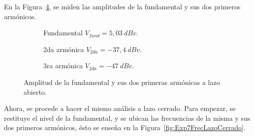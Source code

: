       En la Figura~\ref{fig:Exp7AmplFundYArmonicasLA}, se miden las amplitudes de la fundamental y sus 
      dos primeros armónicos.

    \begin{figure}[H]
        \centering
        \begin{subfigure}[H]{0.48\textwidth}
          \caption{Fundamental $V_{fund}=5,03~dBv$.}
          \label{fig:Exp7AmpFundamentalLA}
        \end{subfigure}
        \hfill 
        \begin{subfigure}[H]{0.48\textwidth}
          \caption{2da armónica $V_{2da}=-37,4~dBv$.}
          \label{fig:Exp7AmpSegundaLA}
        \end{subfigure}     
        \begin{subfigure}[H]{0.48\textwidth}
          \caption{3ra armónica $V_{2da}=-47~dBv$.}
          \label{fig:Exp7AmpTercerLA}
        \end{subfigure}   
        \caption{Amplitud de la fundamental y sus dos primeras armónicas a lazo abierto.}
        \label{fig:Exp7AmplFundYArmonicasLA}
      \end{figure}

      Ahora, se procede a hacer el mismo análisis a lazo cerrado. Para empezar, se restituye el nivel de la 
      fundamental, y se ubican las frecuencias 
      de la misma y sus dos primeros armónicos, ésto se enseña en la Figura~\ref{fig:Exp7FrecLazoCerrado}.

